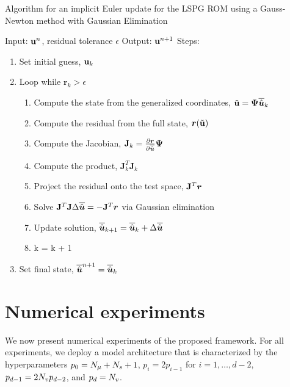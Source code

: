 \documentclass[3p,computermodern,10pt]{elsarticle}
\begin{document}
\begin{algorithm}[H]
\caption{Algorithm for an implicit Euler update for the LSPG ROM using a Gauss-Newton method with Gaussian Elimination}
\label{alg:alg_LSPG}
Input: $\mathbf{u}^n$, residual tolerance $\epsilon$ \;
Output: $\mathbf{u}^{n+1}$\;
Steps:
\begin{enumerate}
\item Set initial guess, $\mathbf{u}_k$
\item  Loop while $\mathbf{r}_k > \epsilon$
\begin{enumerate}
    \item Compute the state from the generalized coordinates, $\tilde{\mathbf{u}}  =\boldsymbol \Psi \overline{\hat{\boldsymbol u}}_{k}$
    \item Compute the residual from the full state, $\boldsymbol{r}(\tilde{\mathbf{u}})$
    \item Compute the Jacobian, $\mathbf{J}_k = \frac{\partial \boldsymbol{r}}{\partial \overline{\hat{\boldsymbol u}}} \boldsymbol \Psi $
    \item Compute the product, $\mathbf{J}_k^T \mathbf{J}_k$
    \item Project the residual onto the test space, $\mathbf{J}^T \boldsymbol{r}$
    \item Solve $\mathbf{J}^T \mathbf{J} \Delta \overline{\hat{\boldsymbol u}} = - \mathbf{J}^T \boldsymbol{r}$ via Gaussian elimination
    \item Update solution, $\overline{\hat{\boldsymbol u}}_{k+1} = \overline{\hat{\boldsymbol u}}_k + \Delta \overline{\hat{\boldsymbol u}}$
    \item k = k + 1
\end{enumerate}
\item Set final state, $\overline{\hat{\boldsymbol u}}^{n+1} = \overline{\hat{\boldsymbol u}}_k$
\end{enumerate}
\end{algorithm}




\section{Numerical experiments}
We now present numerical experiments of the proposed framework. For all experiments, we deploy a model architecture that is characterized by the hyperparameters $p_0 = N_{\mu} + N_s + 1$, $p_i = 2p_{i-1}$ for $i=1,\ldots,d-2$, $p_{d-1} = 2 N_v p_{d-2}$, and $p_{d} = N_v$. 
\end{document}
